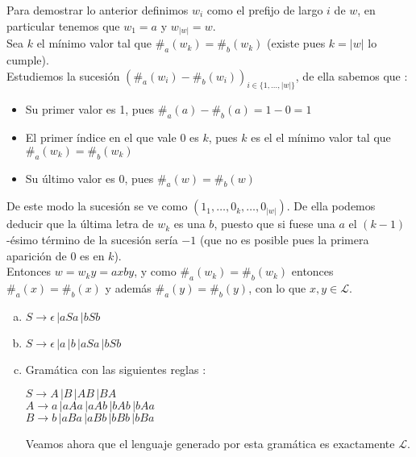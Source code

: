 \documentclass[dcc]{fcfmcourse}
\begin{document}
\begin{problems}
\begin{enumerate}[1.]
Para demostrar lo anterior definimos $w_{i}$ como el prefijo de largo $i$ de $w$, en particular tenemos que $w_{1}=a$ y $w_{|w|}=w$.\\
Sea $k$ el mínimo valor tal que $\#_{a}(w_{k})=\#_{b}(w_{k})$ (existe pues $k=|w|$ lo cumple).\\
Estudiemos la sucesión $(\#_{a}(w_{i})-\#_{b}(w_{i}))_{i\in \{1,\ldots, |w|\}}$, de ella sabemos que :
\begin{itemize}
\item Su primer valor es 1, pues $\#_{a}(a)-\#_{b}(a) = 1-0 = 1$
\item El primer índice en el que vale 0 es $k$, pues $k$ es el el mínimo valor tal que $\#_{a}(w_{k})=\#_{b}(w_{k})$
\item Su último valor es 0, pues $\#_{a}(w)=\#_{b}(w)$
\end{itemize}
De este modo la sucesión se ve como $(1_{1},\ldots,0_{k},\ldots,0_{|w|})$. De ella podemos deducir que la última letra de $w_{k}$ es una $b$, puesto que si fuese una $a$ el $(k-1)$-ésimo término de la sucesión sería $-1$ (que no es posible pues la primera aparición de $0$ es en $k$).\\
Entonces $w = w_{k}y = axby$, y como $\#_{a}(w_{k})=\#_{b}(w_{k})$ entonces $\#_{a}(x)=\#_{b}(x)$ y además $\#_{a}(y)=\#_{b}(y)$, con lo que $x,y \in \mathcal{L}$.
\end{enumerate}
\newpage
\problem
\begin{enumerate}[a)]
\item $S \rightarrow \epsilon\, | aSa\,| bSb$
\item $S \rightarrow \epsilon\, | a\, | b\, | aSa\,| bSb$
\item Gramática con las siguientes reglas :
\begin{center}
$S \rightarrow A\, | B\, | AB\, | BA$\\
$A \rightarrow a\, | aAa\, | aAb\, | bAb\,| bAa$\\
$B \rightarrow b\, | aBa\, | aBb\, | bBb\,| bBa$
\end{center}
Veamos ahora que el lenguaje generado por esta gramática es exactamente $\mathcal{L}$.\\


\end{enumerate}
\end{problems}
\end{document}
